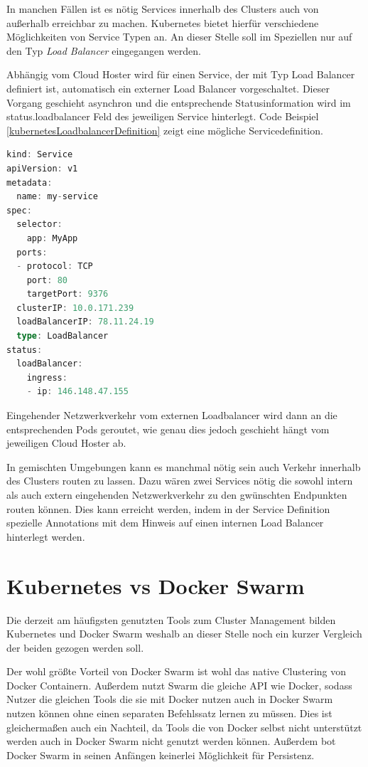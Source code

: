 In manchen Fällen ist es nötig Services innerhalb des Clusters auch von außerhalb erreichbar zu machen.
Kubernetes bietet hierfür verschiedene Möglichkeiten von Service Typen an.
An dieser Stelle soll im Speziellen nur auf den Typ \textit{Load Balancer} eingegangen werden.

Abhängig vom Cloud Hoster wird für einen Service, der mit Typ Load Balancer definiert ist, automatisch ein externer Load Balancer vorgeschaltet.
Dieser Vorgang geschieht asynchron und die entsprechende Statusinformation wird im \glqq{}status.loadbalancer\grqq{} Feld des jeweiligen Service hinterlegt.
Code Beispiel \ref{kubernetesLoadbalancerDefinition} zeigt eine mögliche Servicedefinition.

\begin{minipage}{\linewidth}
	\begin{lstlisting}[frame=single,caption=Kubernetes Service mit Loadbalancer Definition, label=kubernetesLoadbalancerDefinition, language=Scala]
kind: Service
apiVersion: v1
metadata:
  name: my-service
spec:
  selector:
    app: MyApp
  ports:
  - protocol: TCP
    port: 80
    targetPort: 9376
  clusterIP: 10.0.171.239
  loadBalancerIP: 78.11.24.19
  type: LoadBalancer
status:
  loadBalancer:
    ingress:
    - ip: 146.148.47.155
	\end{lstlisting}
\end{minipage}

Eingehender Netzwerkverkehr vom externen Loadbalancer wird dann an die entsprechenden Pods geroutet, wie genau dies jedoch geschieht hängt vom jeweiligen Cloud Hoster ab.

In gemischten Umgebungen kann es manchmal nötig sein auch Verkehr innerhalb des Clusters routen zu lassen.
Dazu wären zwei Services nötig die sowohl intern als auch extern eingehenden Netzwerkverkehr zu den gwünschten Endpunkten routen können.
Dies kann erreicht werden, indem in der Service Definition spezielle Annotations mit dem Hinweis auf einen internen Load Balancer hinterlegt werden.

\section{Kubernetes vs Docker Swarm}

Die derzeit am häufigsten genutzten Tools zum Cluster Management bilden Kubernetes und Docker Swarm weshalb an dieser Stelle noch ein kurzer Vergleich der beiden gezogen werden soll.

Der wohl größte Vorteil von Docker Swarm ist wohl das native Clustering von Docker Containern.
Außerdem nutzt Swarm die gleiche API wie Docker, sodass Nutzer die gleichen Tools die sie mit Docker nutzen auch in Docker Swarm nutzen können ohne einen separaten Befehlssatz lernen zu müssen.
Dies ist gleichermaßen auch ein Nachteil, da Tools die von Docker selbst nicht unterstützt werden auch in Docker Swarm nicht genutzt werden können.
Außerdem bot Docker Swarm in seinen Anfängen keinerlei Möglichkeit für Persistenz.

